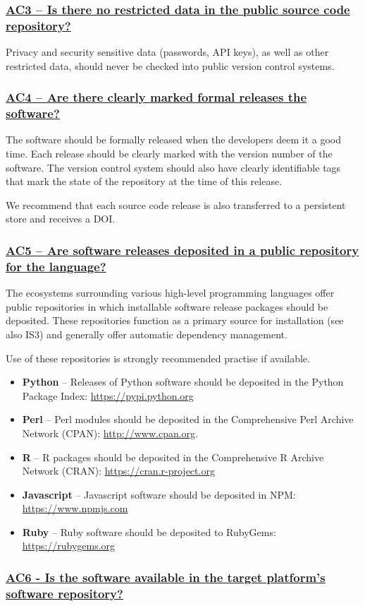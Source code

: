 \documentclass[a4paper,11pt]{article}
\newcommand{\criterion}[1]{\subsubsection*{\underline{#1}}}
\begin{document}
\criterion{AC3 -- Is there no restricted data in the public source code repository?}

Privacy and security sensitive data (passwords, API keys), as well as other
restricted data, should never be checked into public version control systems.

\criterion{AC4 -- Are there clearly marked formal releases the software?}

The software should be formally released when the developers deem it a good
time. Each release should be clearly marked with the version number of the software. The version control
system should also have clearly identifiable tags that mark the state of the
repository at the time of this release.

We recommend that each source code release is also transferred to a persistent
store and receives a DOI.

\criterion{AC5 -- Are software releases deposited in a public
    repository for the language?}

The ecosystems surrounding various high-level programming languages offer
public repositories in which installable software release packages should be
deposited. These repositories function as a primary source for installation (see also
IS3) and generally offer automatic dependency management.

Use of these repositories is strongly recommended practise if available.

\begin{itemize}
    \item \textbf{Python} -- Releases of Python software should be deposited in
        the Python Package Index: \url{https://pypi.python.org}
    \item \textbf{Perl} --  Perl modules should be deposited in the Comprehensive
        Perl Archive Network (CPAN): \url{http://www.cpan.org}.
    \item \textbf{R} -- R packages should be deposited in the Comprehensive R
        Archive Network (CRAN): \url{https://cran.r-project.org}
    \item \textbf{Javascript} -- Javascript software should be deposited in
        NPM: \url{https://www.npmjs.com}
    \item \textbf{Ruby} -- Ruby software should be deposited to 
        RubyGems: \url{https://rubygems.org}
\end{itemize}

\criterion{AC6 - Is the software available in the target platform's software repository?}
\end{document}
